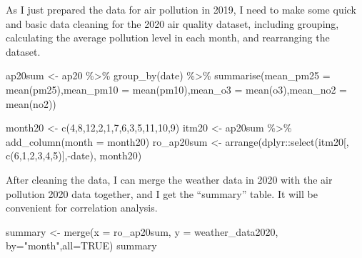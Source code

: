 \documentclass[
]{article}
\newenvironment{Shaded}{\begin{snugshade}}{\end{snugshade}}
\newcommand{\AttributeTok}[1]{\textcolor[rgb]{0.77,0.63,0.00}{#1}}
\newcommand{\ConstantTok}[1]{\textcolor[rgb]{0.00,0.00,0.00}{#1}}
\newcommand{\DecValTok}[1]{\textcolor[rgb]{0.00,0.00,0.81}{#1}}
\newcommand{\FunctionTok}[1]{\textcolor[rgb]{0.00,0.00,0.00}{#1}}
\newcommand{\NormalTok}[1]{#1}
\newcommand{\OtherTok}[1]{\textcolor[rgb]{0.56,0.35,0.01}{#1}}
\newcommand{\SpecialCharTok}[1]{\textcolor[rgb]{0.00,0.00,0.00}{#1}}
\newcommand{\StringTok}[1]{\textcolor[rgb]{0.31,0.60,0.02}{#1}}
\begin{document}
As I just prepared the data for air pollution in 2019, I need to make
some quick and basic data cleaning for the 2020 air quality dataset,
including grouping, calculating the average pollution level in each
month, and rearranging the dataset.

\begin{Shaded}
\begin{Highlighting}[]
\NormalTok{ap20sum }\OtherTok{\textless{}{-}}\NormalTok{ ap20 }\SpecialCharTok{\%\textgreater{}\%}
  \FunctionTok{group\_by}\NormalTok{(date) }\SpecialCharTok{\%\textgreater{}\%}
  \FunctionTok{summarise}\NormalTok{(}\AttributeTok{mean\_pm25 =} \FunctionTok{mean}\NormalTok{(pm25),}\AttributeTok{mean\_pm10 =} \FunctionTok{mean}\NormalTok{(pm10),}\AttributeTok{mean\_o3 =} \FunctionTok{mean}\NormalTok{(o3),}\AttributeTok{mean\_no2 =} \FunctionTok{mean}\NormalTok{(no2))}

\NormalTok{month20 }\OtherTok{\textless{}{-}} \FunctionTok{c}\NormalTok{(}\DecValTok{4}\NormalTok{,}\DecValTok{8}\NormalTok{,}\DecValTok{12}\NormalTok{,}\DecValTok{2}\NormalTok{,}\DecValTok{1}\NormalTok{,}\DecValTok{7}\NormalTok{,}\DecValTok{6}\NormalTok{,}\DecValTok{3}\NormalTok{,}\DecValTok{5}\NormalTok{,}\DecValTok{11}\NormalTok{,}\DecValTok{10}\NormalTok{,}\DecValTok{9}\NormalTok{)}
\NormalTok{itm20 }\OtherTok{\textless{}{-}}\NormalTok{ ap20sum }\SpecialCharTok{\%\textgreater{}\%} \FunctionTok{add\_column}\NormalTok{(}\AttributeTok{month =}\NormalTok{ month20)}
\NormalTok{ro\_ap20sum }\OtherTok{\textless{}{-}} \FunctionTok{arrange}\NormalTok{(dplyr}\SpecialCharTok{::}\FunctionTok{select}\NormalTok{(itm20[, }\FunctionTok{c}\NormalTok{(}\DecValTok{6}\NormalTok{,}\DecValTok{1}\NormalTok{,}\DecValTok{2}\NormalTok{,}\DecValTok{3}\NormalTok{,}\DecValTok{4}\NormalTok{,}\DecValTok{5}\NormalTok{)],}\SpecialCharTok{{-}}\NormalTok{date), month20)}
\end{Highlighting}
\end{Shaded}

After cleaning the data, I can merge the weather data in 2020 with the
air pollution 2020 data together, and I get the ``summary'' table. It
will be convenient for correlation analysis.

\begin{Shaded}
\begin{Highlighting}[]
\NormalTok{summary }\OtherTok{\textless{}{-}} \FunctionTok{merge}\NormalTok{(}\AttributeTok{x =}\NormalTok{ ro\_ap20sum, }\AttributeTok{y =}\NormalTok{ weather\_data2020, }\AttributeTok{by=}\StringTok{"month"}\NormalTok{,}\AttributeTok{all=}\ConstantTok{TRUE}\NormalTok{)}
\NormalTok{summary}
\end{Highlighting}
\end{Shaded}
\end{document}
